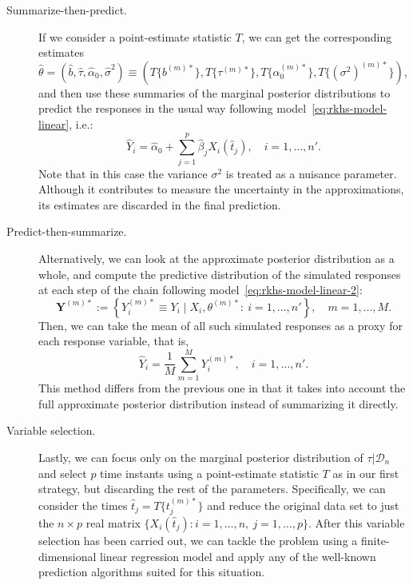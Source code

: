 \documentclass{article}
\numberwithin{equation}{section}
\theoremstyle{plain}
\begin{document}
\begin{description}
  \item[Summarize-then-predict.] If we consider a point-estimate statistic \(T\), we can get the corresponding estimates \(\hat{\theta}=(\hat b, \hat \tau, \hat{\alpha}_0, \hat{\sigma}^2) \equiv (T\{b^{(m)*}\}, T\{\tau^{(m)*}\}, T\{\alpha_0^{(m)*}\}, T\{(\sigma^2)^{(m)*}\})\), and then use these summaries of the marginal posterior distributions to predict the responses in the usual way following model~\eqref{eq:rkhs-model-linear}, i.e.:
    \begin{equation}\label{eq:summarize-predict-linear}
      \hat Y_i = \hat{\alpha}_0 + \sum_{j=1}^p \hat{\beta}_j X_i(\hat{t}_j), \quad i=1,\dots, n'.
    \end{equation}
    Note that in this case the variance \(\sigma^2\) is treated as a nuisance parameter. Although it contributes to measure the uncertainty in the approximations, its estimates are discarded in the final prediction.

  \item[Predict-then-summarize.] Alternatively, we can  look at the approximate posterior distribution as a whole, and compute the predictive distribution of the simulated responses at each step of the chain following model~\eqref{eq:rkhs-model-linear-2}:
    \begin{equation}\label{eq:sampled-response-vector}
      \bm Y^{(m)*} := \left\{Y_i^{(m)*} \equiv Y_i \mid X_i, \theta^{(m)*}:\ i=1,\dots,n'\right\}, \quad m=1,\dots,M.
    \end{equation}
    Then, we can take the mean of all such simulated responses as a proxy for each response variable, that is,
    \[
      \hat Y_i = \frac{1}{M}\sum_{m=1}^M Y_i^{(m)*},\quad i=1,\dots,n'.
    \]
    This method differs from the previous one in that it takes into account the full approximate posterior distribution instead of summarizing it directly.

  \item[Variable selection.] Lastly, we can focus only on the marginal posterior distribution of \(\tau|\mathcal D_n\) and select \(p\) time instants using a point-estimate statistic \(T\) as in our first strategy, but discarding the rest of the parameters. Specifically, we can consider the times \(\hat t_j = T\{t_j^{(m)*}\}\) and reduce the original data set to just the \(n\times p\) real matrix \(\{X_i(\hat t_j): i=1, \dots,n, \ j=1,\dots,p\}\). After this variable selection has been carried out, we can tackle the problem using a finite-dimensional linear regression model and apply any of the well-known prediction algorithms suited for this situation.
\end{description}
\end{document}
